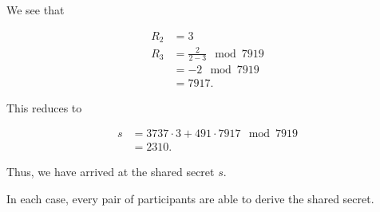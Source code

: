 \begin{example}
\begin{itemize}
\noindent
We see that

\begin{align}
    R_{2} &= 3 \nonumber\\
    R_{3} &= \frac{2}{2-3} \mod 7919 \nonumber\\
        &= -2 \mod 7919 \nonumber\\
        &= 7917.
\end{align}

\noindent
This reduces to

\begin{align}
    s &= 3737\cdot3 + 491\cdot7917 \mod 7919 \nonumber\\
        &= 2310.
\end{align}

\noindent
Thus, we have arrived at the \gls{shared secret} $s$.
\end{itemize}

In each case, every pair of participants are able to derive the
\gls{shared secret}.
\end{example}

